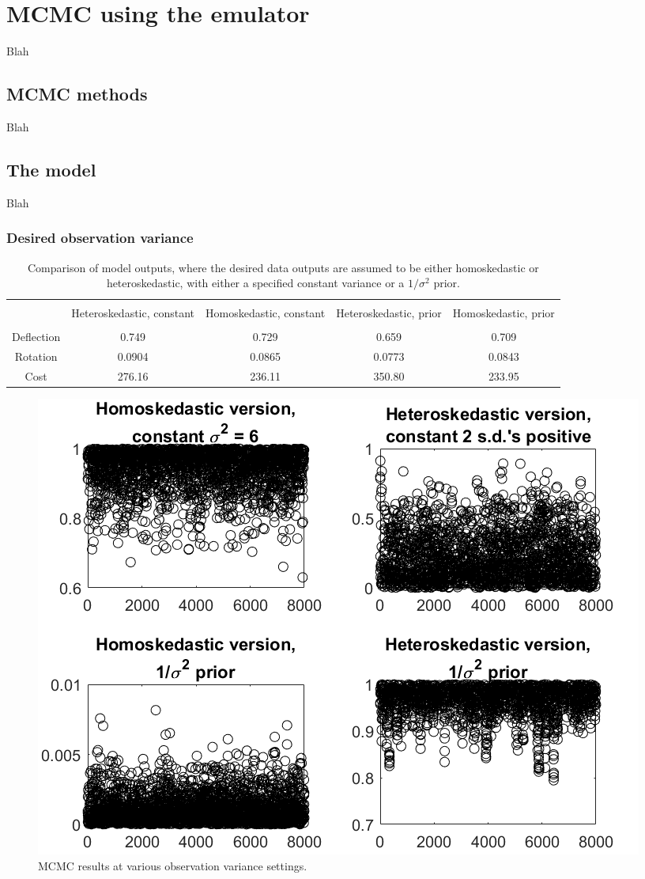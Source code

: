\documentclass{article}
\begin{document}
\section{MCMC using the emulator}
Blah

\subsection{MCMC methods}
Blah

\subsection{The model}
Blah

\subsubsection{Desired observation variance}
\begin{table}[h]
\centering
\begin{tabular}{| c | c  |  c  | c |  c  |}
\hline
 \vspace{-3mm}
& & & & \\
& \parbox{24mm}{\centering Heteroskedastic, constant}& \parbox{24mm}{\centering Homoskedastic, constant}& \parbox{24mm}{\centering Heteroskedastic, prior} & \parbox{24mm}{\centering Homoskedastic, prior}\\
 \vspace{-3.5mm}
& & & & \\
\hline
Deflection & 0.749 & 0.729 & 0.659 & 0.709\\
Rotation & 0.0904 & 0.0865 & 0.0773 & 0.0843\\
Cost & 276.16 & 236.11 & 350.80 & 233.95 \\
\hline
\end{tabular}
\caption{Comparison of model outputs, where the desired data outputs are assumed to be either homoskedastic or heteroskedastic, with either a specified constant variance or a $1/\sigma^2$ prior.}
\label{table:obs_var_comp}
\end{table}

\begin{figure}
\centering
\includegraphics[width=.65\linewidth]{comp_obs_var}
\caption{MCMC results at various observation variance settings.}
\label{fig:comp_obs_var}
\end{figure}
\end{document}
